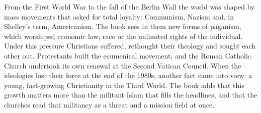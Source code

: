 \begin{partoverview}
From the First World War to the fall of the Berlin Wall the world was shaped by mass movements that
asked for total loyalty: Communism, Nazism and, in Shelley's term, Americanism. The book sees in them
new forms of paganism, which worshiped economic law, race or the unlimited rights of the individual.
Under this pressure Christians suffered, rethought their theology and sought each other out.
Protestants built the ecumenical movement, and the Roman Catholic Church undertook its own renewal at
the Second Vatican Council. When the ideologies lost their force at the end of the 1980s, another fact
came into view: a young, fast-growing Christianity in the Third World. The book adds that this growth
matters more than the militant Islam that fills the headlines, and that the churches read that
militancy as a threat and a mission field at once.
\end{partoverview}

